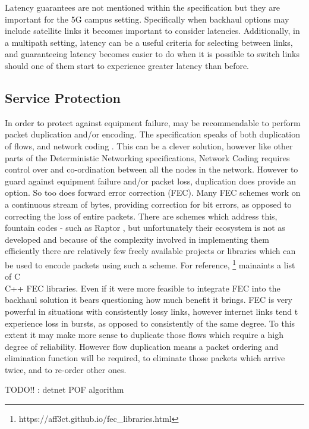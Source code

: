 Latency guarantees are not mentioned within the specification but they are important for the 5G campus setting. Specifically when backhaul options may include satellite links it becomes important to consider latencies. Additionally, in a multipath setting, latency can be a useful criteria for selecting between links, and guaranteeing latency becomes easier to do when it is possible to switch links should one of them start to experience greater latency than before.

\subsection{Service Protection}

In order to protect against equipment failure, may be recommendable to perform packet duplication and/or encoding. The specification speaks of both duplication of flows, and network coding \cite{network-coding}. This can be a clever solution, however like other parts of the Deterministic Networking specifications, Network Coding requires control over and co-ordination between all the nodes in the network. However to guard against equipment failure and/or packet loss, duplication does provide an option. So too does forward error correction (FEC). Many FEC schemes work on a continuous stream of bytes, providing correction for bit errors, as opposed to correcting the loss of entire packets. There are schemes which address this, fountain codes - such as Raptor \cite{raptor}, but unfortunately their ecosystem is not as developed and because of the complexity involved in implementing them efficiently there are relatively few freely available projects or libraries which can be used to encode packets using such a scheme. For reference, \footnote{https://aff3ct.github.io/fec\_libraries.html} mainaints a list of C\\C++ FEC libraries. Even if it were more feasible to integrate FEC into the backhaul solution it bears questioning how much benefit it brings. FEC is very powerful in situations with consistently lossy links, however internet links tend t experience loss in bursts, as opposed to consistently of the same degree. To this extent it may make more sense to duplicate those flows which require a high degree of reliability. However flow duplication means a packet ordering and elimination function will be required, to eliminate those packets which arrive twice, and to re-order other ones.

TODO!! : detnet POF algorithm

